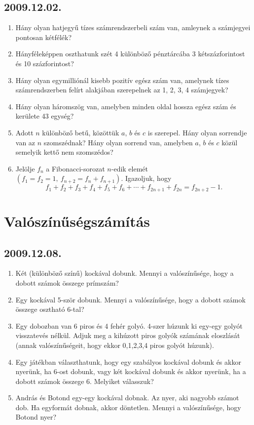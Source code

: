 \subsection*{2009.12.02.}
\begin{enumerate}
\item Hány olyan hatjegyű tízes számrendszerbeli szám van, amleynek a számjegyei pontosan kétfélék?
\item Hányféleképpen oszthatunk szét 4 különböző pénztárcába 3 kétszázforintost és 10 százforintost?
\item Hány olyan egymilliónál kisebb pozitív egész szám van, amelynek tízes számrendszerben felírt alakjában szerepelnek az 1, 2, 3, 4 számjegyek?
\item Hány olyan háromszög van, amelyben minden oldal hossza egész szám és kerülete 43 egység?
\item Adott $n$ különböző betű, közöttük $a$, $b$ és $c$ is szerepel. Hány olyan sorrendje van az $n$ szomszédnak? Hány olyan sorrend van, amelyben $a$, $b$ és $c$ közül semelyik kettő nem szomszédos?
\item Jelölje $f_n$ a Fibonacci-sorozat $n$-edik elemét $(f_1=f_2=1,~f_{n+2}=f_n+f_{n+1})$. Igazoljuk, hogy $$f_1+f_2+f_3+f_4+f_5+f_6+\cdots +f_{2n+1}+f_{2n}=f_{2n+2}-1.$$
\end{enumerate}


\section{Valószínűségszámítás}

\subsection*{2009.12.08.}
\begin{enumerate}
\item Két (különböző színű) kockával dobunk. Mennyi a valószínűsége, hogy a dobott számok összege prímszám?
\item Egy kockával 5-ször dobunk. Mennyi a valószínűsége, hogy a dobott számok összege osztható 6-tal? 
\item Egy dobozban van 6 piros és 4 fehér golyó. 4-szer húzunk ki egy-egy golyót visszatevés nélkül. Adjuk meg a kihúzott piros golyók számának eloszlását (annak valószínűségeit, hogy ekkor 0,1,2,3,4 piros golyót húzunk).
\item Egy játékban választhatunk, hogy egy szabályos kockával dobunk és akkor nyerünk, ha 6-ost dobunk, vagy két kockával dobunk és akkor nyerünk, ha a dobott számok összege 6. Melyiket válasszuk?
\item András és Botond egy-egy kockával dobnak. Az nyer, aki nagyobb számot dob. Ha egyformát dobnak, akkor döntetlen. Mennyi a valószínűsége, hogy Botond nyer?
\end{enumerate}

